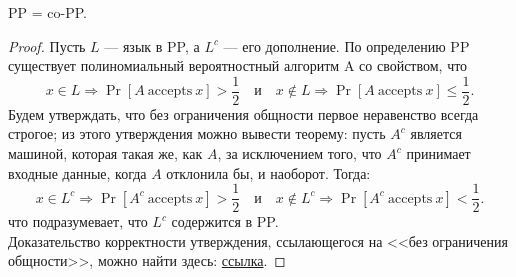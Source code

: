     

    \begin{Thm}
        PP = co-PP.
    \end{Thm}
    \begin{proof}
        Пусть $L$ --- язык в PP, а $L^c$ --- его дополнение. По определению PP существует полиномиальный вероятностный алгоритм A со свойством, что
        $$x \in L \Rightarrow \Pr [A \ {\text{accepts}} \ x] > {\frac{1}{2}} \quad {\text{и}} \quad x \not \in L \Rightarrow \Pr [A \ {\text{accepts}} \ x] \leq {\frac{1}{2}}.$$
        Будем утверждать, что без ограничения общности первое неравенство всегда строгое; из этого утверждения можно вывести теорему: пусть $A^{c}$ является машиной, которая такая же, как $A$, за исключением того, что $A^{c}$ принимает входные данные, когда $A$ отклонила бы, и наоборот. Тогда:
        $$x \in L^{c} \Rightarrow \Pr [A^{c} \ {\text{accepts}} \ x] > {\frac{1}{2}} \quad {\text{и}} \quad x \not \in L^{c} \Rightarrow \Pr [A^{c} \ {\text{accepts}} \ x] < {\frac{1}{2}}.$$
        что подразумевает, что $L^{c}$ содержится в PP.\\
        Доказательство корректности утверждения, ссылающегося на <<без ограничения общности>>, можно найти здесь: \href{https://en.wikipedia.org/wiki/PP_(complexity)}{ссылка}.
    \end{proof}

    
    
